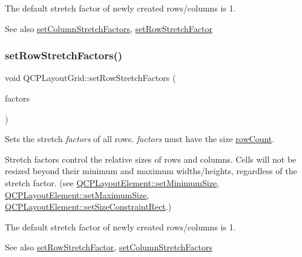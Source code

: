 The default stretch factor of newly created rows/columns is 1.

\begin{DoxySeeAlso}{See also}
\hyperlink{classQCPLayoutGrid_a6c2591d1a7e2534ce036989543b49e57}{set\+Column\+Stretch\+Factors}, \hyperlink{classQCPLayoutGrid_a7b0273de5369bd93d942edbaf5b166ec}{set\+Row\+Stretch\+Factor} 
\end{DoxySeeAlso}
\mbox{\label{classQCPLayoutGrid_a200b45f9c908f96ebadaa3c8d87a2782}} 
\subsubsection{\texorpdfstring{set\+Row\+Stretch\+Factors()}{setRowStretchFactors()}}
{\footnotesize\ttfamily void Q\+C\+P\+Layout\+Grid\+::set\+Row\+Stretch\+Factors (\begin{DoxyParamCaption}\item[{const Q\+List$<$ double $>$ \&}]{factors }\end{DoxyParamCaption})}

Sets the stretch {\itshape factors} of all rows. {\itshape factors} must have the size \hyperlink{classQCPLayoutGrid_a19c66fd76cbce58a8e94f33797e0c0aa}{row\+Count}.

Stretch factors control the relative sizes of rows and columns. Cells will not be resized beyond their minimum and maximum widths/heights, regardless of the stretch factor. (see \hyperlink{classQCPLayoutElement_a5dd29a3c8bc88440c97c06b67be7886b}{Q\+C\+P\+Layout\+Element\+::set\+Minimum\+Size}, \hyperlink{classQCPLayoutElement_a74eb5280a737ab44833d506db65efd95}{Q\+C\+P\+Layout\+Element\+::set\+Maximum\+Size}, \hyperlink{classQCPLayoutElement_a361666cdcc6fbfd37344cc44be746b0f}{Q\+C\+P\+Layout\+Element\+::set\+Size\+Constraint\+Rect}.)

The default stretch factor of newly created rows/columns is 1.

\begin{DoxySeeAlso}{See also}
\hyperlink{classQCPLayoutGrid_a7b0273de5369bd93d942edbaf5b166ec}{set\+Row\+Stretch\+Factor}, \hyperlink{classQCPLayoutGrid_a6c2591d1a7e2534ce036989543b49e57}{set\+Column\+Stretch\+Factors} 
\end{DoxySeeAlso}
\mbox{\label{classQCPLayoutGrid_ab36af18d77e4428386d02970382ee598}} 
